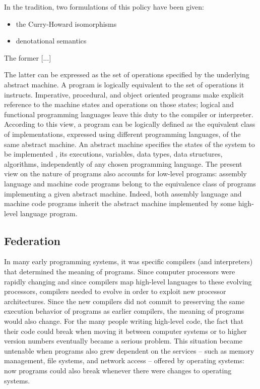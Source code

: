 \documentclass[]{article}
\begin{document}
In the tradition, two formulations of this policy have been given:

\begin{itemize}
\item the Curry-Howard isomorphisms
\item denotational semantics
\end{itemize}




{\color{red}{this passage is inspired by Jean-Baptiste's note}}


The former [...]

The latter can be expressed as the set of operations specified by the underlying abstract machine. A program is logically equivalent to the set of
operations it instructs. Imperative, procedural, and object oriented programs make explicit reference to the machine states and operations on those states; logical and functional programming languages leave this duty to the compiler or interpreter.  According to this view, a program can be logically defined as the equivalent class of implementations, expressed using different programming languages, of the same abstract machine. An abstract machine specifies the states of the system to be  implemented , its executions, variables, data types, data structures, algorithms, independently of any chosen programming language. The present view on the nature of programs also accounts for low-level programs: assembly language and machine code programs belong to the equivalence class of programs implementing a given abstract machine. Indeed, both assembly language and machine code programs inherit the abstract machine implemented by some high-level language program.



\subsection{Federation}


{\color{red}{this passage is inspired by Dale's note}}


In many early programming systems, it was specific compilers (and interpreters) that determined the meaning of programs. Since computer processors were rapidly changing and since compilers map high-level languages to these evolving processors, compilers needed to evolve in order to exploit new processor architectures. Since the new compilers did not commit to preserving the same execution behavior of programs
as earlier compilers, the meaning of programs would also change. For
the many people writing high-level code, the fact that their code
could break when moving it between computer systems or to higher
version numbers eventually became a serious problem. This situation
became untenable when programs also grew dependent on the
services -- such as memory management, file systems, and network
access -- offered by operating systems: now programs could also break
whenever there were changes to operating systems.
\end{document}
